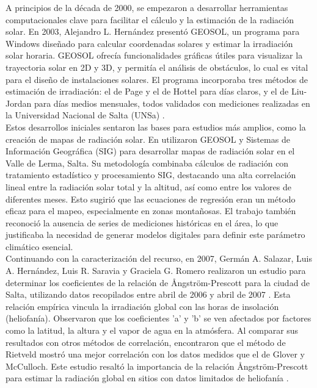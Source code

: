 A principios de la década de 2000, se empezaron a desarrollar herramientas computacionales clave para facilitar el cálculo y la estimación de la radiación solar. En 2003, Alejandro L. Hernández presentó GEOSOL, un programa para Windows diseñado para calcular coordenadas solares y estimar la irradiación solar horaria. GEOSOL ofrecía funcionalidades gráficas útiles para visualizar la trayectoria solar en 2D y 3D, y permitía el análisis de obstáculos, lo cual es vital para el diseño de instalaciones solares. El programa incorporaba tres métodos de estimación de irradiación: el de Page y el de Hottel para días claros, y el de Liu-Jordan para días medios mensuales, todos validados con mediciones realizadas en la Universidad Nacional de Salta (UNSa) \cite{Hernandez2003}.\\

Estos desarrollos iniciales sentaron las bases para estudios más amplios, como la creación de mapas de radiación solar. En \cite{Belmonte2006} utilizaron GEOSOL y Sistemas de Información Geográfica (SIG) para desarrollar mapas de radiación solar en el Valle de Lerma, Salta. Su metodología combinaba cálculos de radiación con tratamiento estadístico y procesamiento SIG, destacando una alta correlación lineal entre la radiación solar total y la altitud, así como entre los valores de diferentes meses. Esto sugirió que las ecuaciones de regresión eran un método eficaz para el mapeo, especialmente en zonas montañosas. El trabajo también reconoció la ausencia de series de mediciones históricas en el área, lo que justificaba la necesidad de generar modelos digitales para definir este parámetro climático esencial.\\

Continuando con la caracterización del recurso, en 2007, Germán A. Salazar, Luis A. Hernández, Luis R. Saravia y Graciela G. Romero realizaron un estudio para determinar los coeficientes de la relación de Ångström-Prescott para la ciudad de Salta, utilizando datos recopilados entre abril de 2006 y abril de 2007
. Esta relación empírica vincula la irradiación global con las horas de insolación (heliofanía). Observaron que los coeficientes 'a' y 'b' se ven afectados por factores como la latitud, la altura y el vapor de agua en la atmósfera. Al comparar sus resultados con otros métodos de correlación, encontraron que el método de Rietveld mostró una mejor correlación con los datos medidos que el de Glover y McCulloch. Este estudio resaltó la importancia de la relación Ångström-Prescott para estimar la radiación global en sitios con datos limitados de heliofanía \cite{Salazar2007}.\\ 

